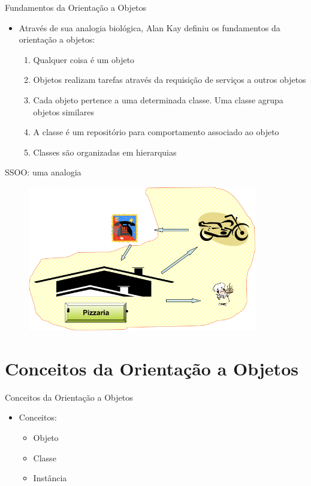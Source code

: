 \documentclass{beamer}
\begin{document}
\begin{frame}{Fundamentos da Orientação a Objetos}
    \begin{itemize}
        \item Através de sua analogia biológica, Alan Kay definiu os fundamentos da orientação a objetos:
        \begin{enumerate}
            \item Qualquer coisa é um objeto
            \item Objetos realizam tarefas através da requisição de serviços a outros objetos
            \item Cada objeto pertence a uma determinada classe. Uma classe agrupa objetos similares
            \item A classe é um repositório para comportamento associado ao objeto
            \item Classes são organizadas em hierarquias
        \end{enumerate}
    \end{itemize}
\end{frame}

\begin{frame}{SSOO: uma analogia}
    \begin{figure}
        \includegraphics[width=10cm]{Theme/Logos/exemplo_ssoo.png}
    \end{figure}
\end{frame}

\section{Conceitos da Orientação a Objetos}

\begin{frame}{Conceitos da Orientação a Objetos}
    \begin{itemize}
        \item Conceitos:
        \begin{itemize}
            \item Objeto
            \item Classe
            \item Instância
        \end{itemize}
    \end{itemize}
\end{frame}
\end{document}
